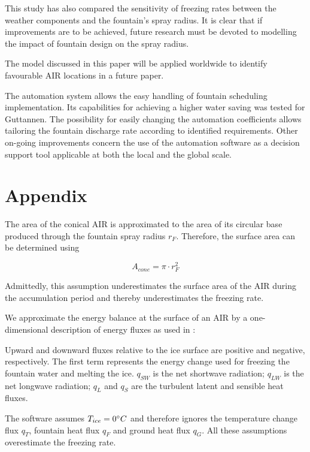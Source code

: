 \documentclass[utf8]{frontiersSCNS}
\begin{document}
This study has also compared the sensitivity of freezing rates between the weather components and the fountain's
spray radius. It is clear that if improvements are to be achieved, future research must be devoted to modelling
the impact of fountain design on the spray radius.

The model discussed in this paper will be applied worldwide to identify favourable AIR locations in a future
paper.


The automation system allows the easy handling of fountain scheduling implementation. Its capabilities for
achieving a higher water saving was tested for Guttannen. The possibility for easily changing the automation
coefficients allows tailoring the fountain discharge rate according to identified requirements. Other on-going
improvements concern the use of the automation software as a decision support tool applicable at both the local
and the global scale.

\section{Appendix}

The area of the conical AIR is approximated to the area of its circular base produced through the fountain spray
radius $r_F$. Therefore, the surface area can be determined using

\begin{equation} A_{cone} =\pi \cdot r_{F}^2 \label{eq:Area} \end{equation}

Admittedly, this assumption underestimates the surface area of the AIR during the accumulation period and
thereby underestimates the freezing rate.

We approximate the energy balance at the surface of an AIR by a one-dimensional description of energy fluxes as
used in \cite{balasubramanianInfluenceMeteorologicalConditions2022}:


Upward and downward fluxes relative to the ice surface are positive and negative, respectively. The first term
represents the energy change used for freezing the fountain water and melting the ice. $q_{SW}$ is the net
shortwave radiation; $q_{LW}$ is the net longwave radiation; $q_{L}$ and $q_{S}$ are the turbulent latent and
sensible heat fluxes. 

The software assumes $T_{ice} = 0 \degree C$ and therefore ignores the temperature change flux $q_{T}$, fountain
heat flux $q_{F}$ and ground heat flux $q_{G}$. All these assumptions overestimate the freezing rate.
\end{document}
